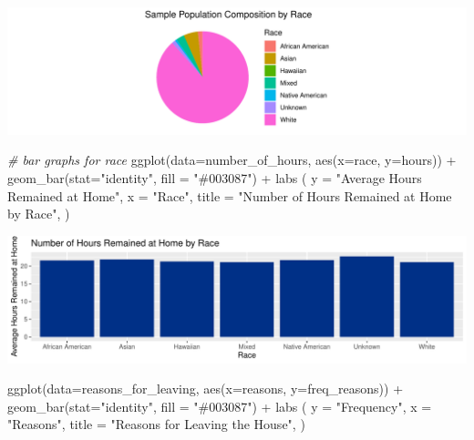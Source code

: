 \documentclass[
  11 pt,
]{article}
\newenvironment{Shaded}{\begin{snugshade}}{\end{snugshade}}
\newcommand{\AttributeTok}[1]{\textcolor[rgb]{0.77,0.63,0.00}{#1}}
\newcommand{\CommentTok}[1]{\textcolor[rgb]{0.56,0.35,0.01}{\textit{#1}}}
\newcommand{\FunctionTok}[1]{\textcolor[rgb]{0.00,0.00,0.00}{#1}}
\newcommand{\NormalTok}[1]{#1}
\newcommand{\SpecialCharTok}[1]{\textcolor[rgb]{0.00,0.00,0.00}{#1}}
\newcommand{\StringTok}[1]{\textcolor[rgb]{0.31,0.60,0.02}{#1}}
\begin{document}
\includegraphics{finalreport_template_files/figure-latex/data-analysis-1.pdf}

\begin{Shaded}
\begin{Highlighting}[]
\CommentTok{\# bar graphs for race}
\FunctionTok{ggplot}\NormalTok{(}\AttributeTok{data=}\NormalTok{number\_of\_hours, }\FunctionTok{aes}\NormalTok{(}\AttributeTok{x=}\NormalTok{race, }\AttributeTok{y=}\NormalTok{hours)) }\SpecialCharTok{+}
  \FunctionTok{geom\_bar}\NormalTok{(}\AttributeTok{stat=}\StringTok{"identity"}\NormalTok{, }\AttributeTok{fill =} \StringTok{"\#003087"}\NormalTok{) }\SpecialCharTok{+}
  \FunctionTok{labs}\NormalTok{ (}
    \AttributeTok{y =} \StringTok{"Average Hours Remained at Home"}\NormalTok{,}
    \AttributeTok{x =} \StringTok{"Race"}\NormalTok{,}
    \AttributeTok{title =} \StringTok{"Number of Hours Remained at Home by Race"}\NormalTok{,}
\NormalTok{    ) }
\end{Highlighting}
\end{Shaded}

\includegraphics{finalreport_template_files/figure-latex/data-analysis-2.pdf}

\begin{Shaded}
\begin{Highlighting}[]
\FunctionTok{ggplot}\NormalTok{(}\AttributeTok{data=}\NormalTok{reasons\_for\_leaving, }\FunctionTok{aes}\NormalTok{(}\AttributeTok{x=}\NormalTok{reasons, }\AttributeTok{y=}\NormalTok{freq\_reasons)) }\SpecialCharTok{+}
  \FunctionTok{geom\_bar}\NormalTok{(}\AttributeTok{stat=}\StringTok{"identity"}\NormalTok{, }\AttributeTok{fill =} \StringTok{"\#003087"}\NormalTok{) }\SpecialCharTok{+}
  \FunctionTok{labs}\NormalTok{ (}
    \AttributeTok{y =} \StringTok{"Frequency"}\NormalTok{,}
    \AttributeTok{x =} \StringTok{"Reasons"}\NormalTok{,}
    \AttributeTok{title =} \StringTok{"Reasons for Leaving the House"}\NormalTok{,}
\NormalTok{    ) }
\end{Highlighting}
\end{Shaded}
\end{document}
